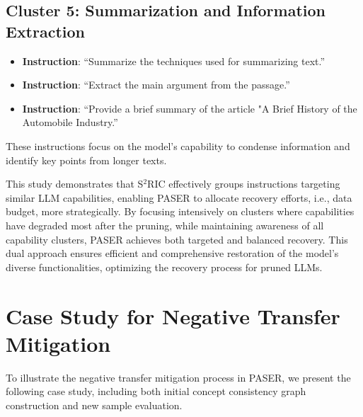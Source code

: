 \subsection{Cluster 5: Summarization and Information Extraction}
\begin{itemize}[leftmargin=*]
    \item \textbf{Instruction}: ``Summarize the techniques used for summarizing text.''
    \item \textbf{Instruction}: ``Extract the main argument from the passage.''
    \item \textbf{Instruction}: ``Provide a brief summary of the article "A Brief History of the Automobile Industry.''
\end{itemize}
These instructions focus on the model's capability to condense information and identify key points from longer texts. 

This study demonstrates that S$^2$RIC effectively groups instructions targeting similar LLM capabilities, enabling PASER to allocate recovery efforts, i.e., data budget, more strategically. By focusing intensively on clusters where capabilities have degraded most after the pruning, while maintaining awareness of all capability clusters, PASER achieves both targeted and balanced recovery. This dual approach ensures efficient and comprehensive restoration of the model's diverse functionalities, optimizing the recovery process for pruned LLMs.



\section{Case Study for Negative Transfer Mitigation}
\label{appendix: case study mitigation}
To illustrate the negative transfer mitigation process in PASER, we present the following case study, including both initial concept consistency graph construction and new sample evaluation.
